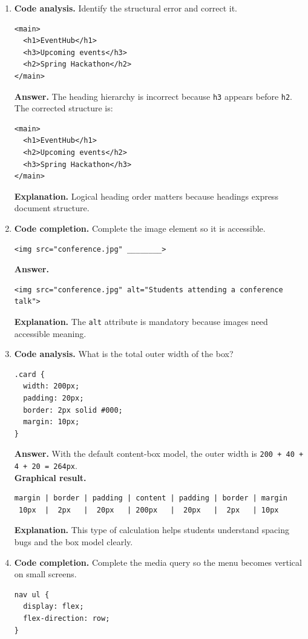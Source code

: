 \documentclass[11pt,a4paper]{article}
\begin{document}
\begin{enumerate}
  \item \textbf{Code analysis.} Identify the structural error and correct it.
\begin{lstlisting}[style=code]
<main>
  <h1>EventHub</h1>
  <h3>Upcoming events</h3>
  <h2>Spring Hackathon</h2>
</main>
\end{lstlisting}
\textbf{Answer.} The heading hierarchy is incorrect because \texttt{h3} appears before \texttt{h2}. The corrected structure is:
\begin{lstlisting}[style=code]
<main>
  <h1>EventHub</h1>
  <h2>Upcoming events</h2>
  <h3>Spring Hackathon</h3>
</main>
\end{lstlisting}
\textbf{Explanation.} Logical heading order matters because headings express document structure.

  \item \textbf{Code completion.} Complete the image element so it is accessible.
\begin{lstlisting}[style=code]
<img src="conference.jpg" ________>
\end{lstlisting}
\textbf{Answer.}
\begin{lstlisting}[style=code]
<img src="conference.jpg" alt="Students attending a conference talk">
\end{lstlisting}
\textbf{Explanation.} The \texttt{alt} attribute is mandatory because images need accessible meaning.

  \item \textbf{Code analysis.} What is the total outer width of the box?
\begin{lstlisting}[style=code]
.card {
  width: 200px;
  padding: 20px;
  border: 2px solid #000;
  margin: 10px;
}
\end{lstlisting}
\textbf{Answer.} With the default content-box model, the outer width is \texttt{200 + 40 + 4 + 20 = 264px}.\\
\textbf{Graphical result.}
\begin{lstlisting}[style=terminal]
margin | border | padding | content | padding | border | margin
 10px  |  2px   |  20px   | 200px   |  20px   |  2px   | 10px
\end{lstlisting}
\textbf{Explanation.} This type of calculation helps students understand spacing bugs and the box model clearly.

  \item \textbf{Code completion.} Complete the media query so the menu becomes vertical on small screens.
\begin{lstlisting}[style=code]
nav ul {
  display: flex;
  flex-direction: row;
}


\end{lstlisting}
\end{enumerate}
\end{document}
